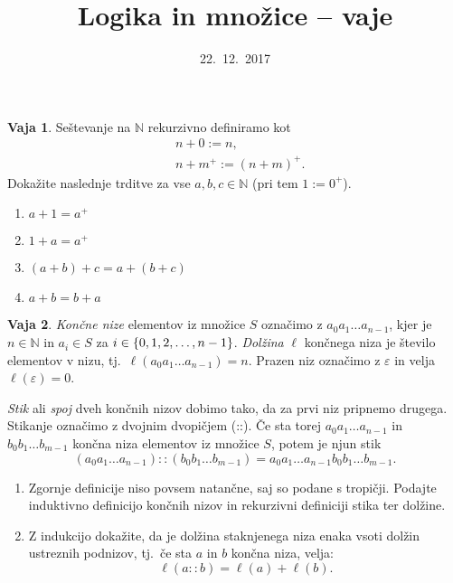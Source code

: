\documentclass{article}
\newcommand{\NN}{\mathbb{N}}
\theoremstyle{definition}
\newtheorem{vaja}{Vaja}
\begin{document}
\title{Logika in množice -- vaje}
\date{22.~12.~2017}
\maketitle

\begin{vaja}
  Seštevanje na $\NN$ rekurzivno definiramo kot
  \begin{align*}
    &n + 0 := n, \\
    &n + m^+ := (n + m)^+.
  \end{align*}
  Dokažite naslednje trditve za vse $a, b, c \in \NN$ (pri tem $1 := 0^+$).
  \begin{enumerate}
    \item
      $a + 1 = a^+$
    \item
      $1 + a = a^+$
    \item
      $(a + b) + c = a + (b + c)$
    \item
      $a + b = b + a$
  \end{enumerate}
\end{vaja}

\begin{vaja}
	\emph{Končne nize} elementov iz množice $S$ označimo z $a_0 a_1 \ldots a_{n-1}$, kjer je $n \in \NN$ in $a_i \in S$ za $i \in \set{0, 1, 2, \ldots, n-1}$. \emph{Dolžina} $\ell$ končnega niza je število elementov v nizu, tj.~$\ell(a_0 a_1 \ldots a_{n-1}) = n$. Prazen niz označimo z $\varepsilon$ in velja $\ell(\varepsilon) = 0$.
	
	\emph{Stik} ali \emph{spoj} dveh končnih nizov dobimo tako, da za prvi niz pripnemo drugega. Stikanje označimo z dvojnim dvopičjem (::). Če sta torej $a_0 a_1 \ldots a_{n-1}$ in $b_0 b_1 \ldots b_{m-1}$ končna niza elementov iz množice $S$, potem je njun stik
	\[(a_0 a_1 \ldots a_{n-1}) :: (b_0 b_1 \ldots b_{m-1}) = a_0 a_1 \ldots a_{n-1} b_0 b_1 \ldots b_{m-1}.\]
	\begin{enumerate}
		\item
			Zgornje definicije niso povsem natančne, saj so podane s tropičji. Podajte induktivno definicijo končnih nizov in rekurzivni definiciji stika ter dolžine.
		\item
			Z indukcijo dokažite, da je dolžina staknjenega niza enaka vsoti dolžin ustreznih podnizov, tj.~če sta $a$ in $b$ končna niza, velja:
			\[\ell(a :: b) = \ell(a) + \ell(b).\]
	\end{enumerate}
\end{vaja}

\pagebreak
\end{document}
